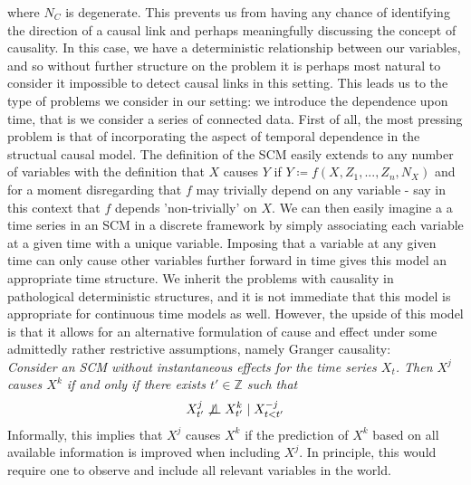 \documentclass[11pt, a4paper]{memoir}
\newcommand{\mZ}{\mathbb{Z}}
\newcommand{\indep}{\perp \!\!\! \perp}
\begin{document}
where $N_C$ is degenerate. This prevents us from having any chance of identifying the direction of a causal link and perhaps meaningfully discussing the concept of causality. In this case, we have a deterministic relationship between our variables, and so without further structure on the problem it is perhaps most natural to consider it impossible to detect causal links in this setting. This leads us to the type of problems we consider in our setting: we introduce the dependence upon time, that is we consider a series of connected data. First of all, the most pressing problem is that of incorporating the aspect of temporal dependence in the structual causal model. The definition of the SCM easily extends to any number of variables with the definition that $X$ causes $Y$ if $Y\coloneqq f(X,Z_1,...,Z_n,N_X)$ and for a moment disregarding that $f$ may trivially depend on any variable - say in this context that $f$ depends 'non-trivially' on $X$. We can then easily imagine a a time series in an SCM in a discrete framework by simply associating each variable at a given time with a unique variable. Imposing that a variable at any given time can only cause other variables further forward in time gives this model an appropriate time structure. We inherit the problems with causality in pathological deterministic structures, and it is not immediate that this model is appropriate for continuous time models as well. However, the upside of this model is that it allows for an alternative formulation of cause and effect under some admittedly rather restrictive assumptions, namely Granger causality:\\
\textit{Consider an SCM without instantaneous effects for the time series $X_t$. Then $X^j$ causes $X^k$ if and only if there exists $t'\in \mZ$ such that
$$X_{t'}^j\centernot \indep X_{t'}^k\mid X_{t<t'}^{-j}$$}
Informally, this implies that $X^j$ causes $X^k$ if the prediction of $X^k$ based on all available information is improved when including $X^j$. In principle, this would require one to observe and include all relevant variables in the world.\\
\end{document}
